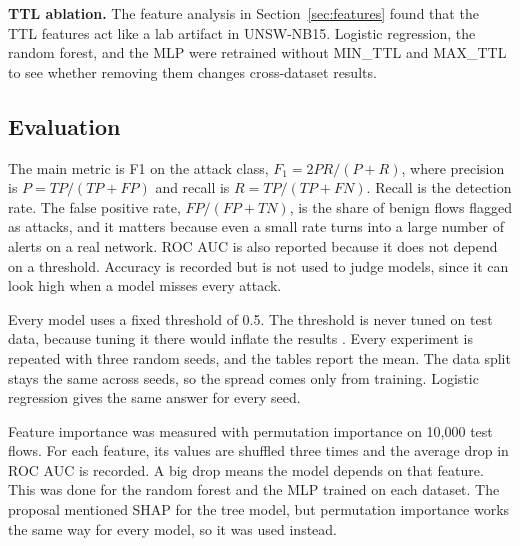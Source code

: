 \textbf{TTL ablation.} The feature analysis in Section~\ref{sec:features} found that the TTL features act like a lab artifact in UNSW-NB15. Logistic regression, the random forest, and the MLP were retrained without MIN\_TTL and MAX\_TTL to see whether removing them changes cross-dataset results.

\subsection{Evaluation}

The main metric is F1 on the attack class, $F_1 = 2PR/(P + R)$, where precision is $P = TP/(TP + FP)$ and recall is $R = TP/(TP + FN)$. Recall is the detection rate. The false positive rate, $FP/(FP + TN)$, is the share of benign flows flagged as attacks, and it matters because even a small rate turns into a large number of alerts on a real network. ROC AUC is also reported because it does not depend on a threshold. Accuracy is recorded but is not used to judge models, since it can look high when a model misses every attack.

Every model uses a fixed threshold of 0.5. The threshold is never tuned on test data, because tuning it there would inflate the results \cite{arp2022}. Every experiment is repeated with three random seeds, and the tables report the mean. The data split stays the same across seeds, so the spread comes only from training. Logistic regression gives the same answer for every seed.

Feature importance was measured with permutation importance on 10,000 test flows. For each feature, its values are shuffled three times and the average drop in ROC AUC is recorded. A big drop means the model depends on that feature. This was done for the random forest and the MLP trained on each dataset. The proposal mentioned SHAP for the tree model, but permutation importance works the same way for every model, so it was used instead.
